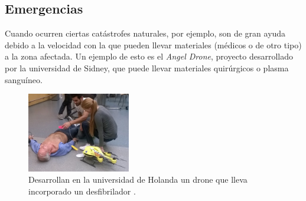 
	\subsection{Emergencias}
\hspace{1 cm} Cuando ocurren ciertas cat\'astrofes naturales, por ejemplo, son de gran ayuda debido a la velocidad con la que pueden llevar materiales (m\'edicos o de otro tipo) a la zona afectada. Un ejemplo de esto es el \textit{Angel Drone}, proyecto desarrollado por la universidad de Sidney, que puede llevar materiales quir\'urgicos o plasma sangu\'ineo.

\begin{figure}[H]
	\centering
		\includegraphics[width=0.4\textwidth]{imgs/drone_desfibrilador.jpg}
		\caption{Desarrollan en la universidad de Holanda un drone que lleva incorporado un desfibrilador .}
	\label{fig: Drone con desfibrilador para emergencias.}
\end{figure} 


